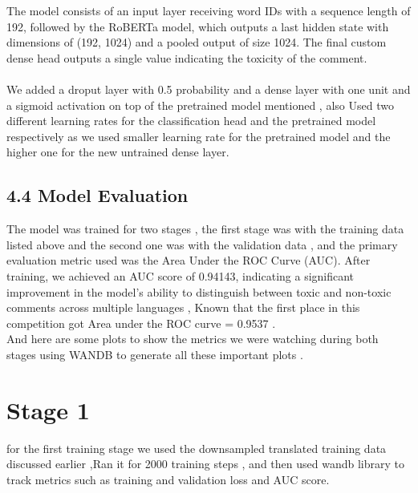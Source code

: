 \documentclass{article}
\begin{document}
The model consists of an input layer receiving word IDs with a sequence length of 192, followed by the RoBERTa model, which outputs a last hidden state with dimensions of (192, 1024) and a pooled output of size 1024. The final custom dense head outputs a single value indicating the toxicity of the comment.
\\
\\
We added a  droput layer with 0.5 probability and a dense layer with one unit and a sigmoid activation on top of the pretrained model mentioned , also Used two different learning rates for the classification head and the pretrained model respectively as we used smaller learning rate for the pretrained model and the higher one for the new untrained dense layer.






\subsection*{4.4 Model Evaluation}
The model was trained for two  stages , the first stage was with the training data listed above and the second one was with the validation data , and the primary evaluation metric used was the Area Under the ROC Curve (AUC). After training, we achieved an AUC score of 0.94143, indicating a significant improvement in the model's ability to distinguish between toxic and non-toxic comments across multiple languages , Known that the first place in this competition got Area under the ROC curve = 0.9537 .\\
And here are some plots to show the metrics we were watching during both stages using WANDB to generate all these important plots  . \\ 
\section*{Stage 1}
for the first training stage we used the downsampled translated training data discussed earlier ,Ran it for 2000 training steps , and then used wandb library to track metrics such as training and validation loss and AUC score.
\\
\\
\end{document}
